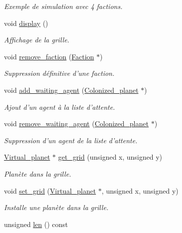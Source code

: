 \begin{DoxyCompactItemize}
\begin{DoxyCompactList}\small\item\em Exemple de simulation avec 4 factions. \end{DoxyCompactList}\item 
void \hyperlink{classWorld_a007f9908bb224a8fb4b6b58820971eed}{display} ()
\begin{DoxyCompactList}\small\item\em Affichage de la grille. \end{DoxyCompactList}\item 
void \hyperlink{classWorld_ab01f5891ce4a1532563b4674de788daf}{remove\-\_\-faction} (\hyperlink{classFaction}{Faction} $\ast$)
\begin{DoxyCompactList}\small\item\em Suppression définitive d'une faction. \end{DoxyCompactList}\item 
void \hyperlink{classWorld_adfedeb704ce247d881bd9565d9d867d4}{add\-\_\-waiting\-\_\-agent} (\hyperlink{classColonized__planet}{Colonized\-\_\-planet} $\ast$)
\begin{DoxyCompactList}\small\item\em Ajout d'un agent à la liste d'attente. \end{DoxyCompactList}\item 
void \hyperlink{classWorld_a5abd90500d2a6e70ef6d21dbc02cb440}{remove\-\_\-waiting\-\_\-agent} (\hyperlink{classColonized__planet}{Colonized\-\_\-planet} $\ast$)
\begin{DoxyCompactList}\small\item\em Suppression d'un agent de la liste d'attente. \end{DoxyCompactList}\item 
\hyperlink{classVirtual__planet}{Virtual\-\_\-planet} $\ast$ \hyperlink{classWorld_a6c5e27cae9fd6a526da0f4c58b320733}{get\-\_\-grid} (unsigned x, unsigned y)
\begin{DoxyCompactList}\small\item\em Planète dans la grille. \end{DoxyCompactList}\item 
void \hyperlink{classWorld_a593960e61c13083719721b0c289dad94}{set\-\_\-grid} (\hyperlink{classVirtual__planet}{Virtual\-\_\-planet} $\ast$, unsigned x, unsigned y)
\begin{DoxyCompactList}\small\item\em Installe une planète dans la grille. \end{DoxyCompactList}\item 
\hypertarget{classWorld_a9263bc299d1446cc7435c58fc70dbc12}{unsigned \hyperlink{classWorld_a9263bc299d1446cc7435c58fc70dbc12}{len} () const }\label{classWorld_a9263bc299d1446cc7435c58fc70dbc12}


\end{DoxyCompactItemize}
